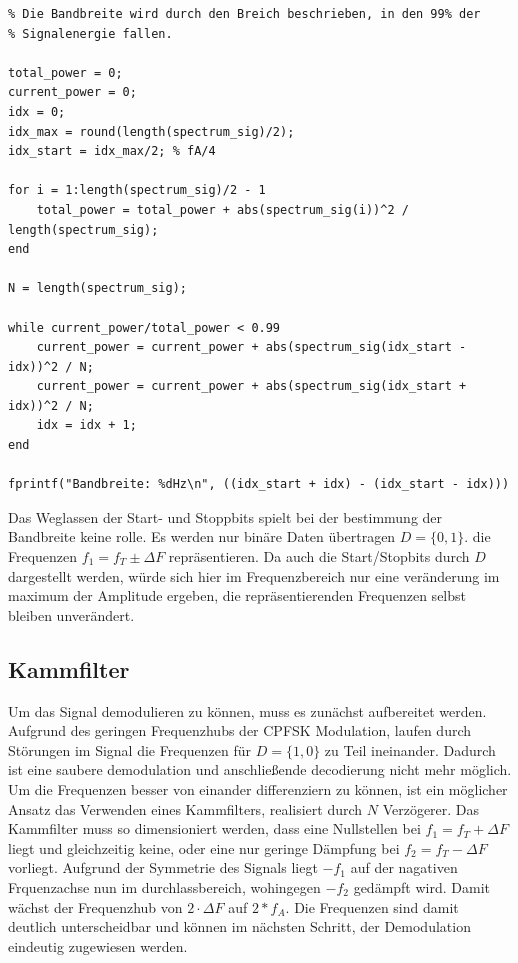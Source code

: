 \documentclass{article}
\begin{document}
\begin{verbatim}
% Die Bandbreite wird durch den Breich beschrieben, in den 99% der
% Signalenergie fallen.

total_power = 0;
current_power = 0;
idx = 0;
idx_max = round(length(spectrum_sig)/2);
idx_start = idx_max/2; % fA/4

for i = 1:length(spectrum_sig)/2 - 1
    total_power = total_power + abs(spectrum_sig(i))^2 / length(spectrum_sig);
end

N = length(spectrum_sig);

while current_power/total_power < 0.99
    current_power = current_power + abs(spectrum_sig(idx_start - idx))^2 / N;
    current_power = current_power + abs(spectrum_sig(idx_start + idx))^2 / N;
    idx = idx + 1;
end

fprintf("Bandbreite: %dHz\n", ((idx_start + idx) - (idx_start - idx)))
\end{verbatim}

Das Weglassen der Start- und Stoppbits spielt bei der bestimmung der Bandbreite keine rolle.
Es werden nur binäre Daten übertragen $D = \{0, 1\}$. die Frequenzen $ f_1 = f_T \pm \varDelta F $ repräsentieren. 
Da auch die Start/Stopbits durch $D$ dargestellt werden, würde sich hier im Frequenzbereich
nur eine veränderung im maximum der Amplitude ergeben, die repräsentierenden Frequenzen selbst bleiben unverändert.

\subsection{Kammfilter}
Um das Signal demodulieren zu können, muss es zunächst aufbereitet werden. 
Aufgrund des geringen Frequenzhubs der CPFSK Modulation, laufen durch Störungen im Signal die Frequenzen 
für $D = \{1, 0\}$ zu Teil ineinander. Dadurch ist eine saubere demodulation und anschließende decodierung
nicht mehr möglich. Um die Frequenzen besser von einander differenziern zu können, ist ein möglicher Ansatz 
das Verwenden eines Kammfilters, realisiert durch $N$ Verzögerer.
Das Kammfilter muss so dimensioniert werden, dass eine Nullstellen bei $f_1 = f_T + \varDelta F$ liegt und 
gleichzeitig keine, oder eine nur geringe Dämpfung bei $f_2 = f_T - \varDelta F$ vorliegt.
Aufgrund der Symmetrie des Signals liegt $-f_1$ auf der nagativen Frquenzachse nun im durchlassbereich, wohingegen 
$-f_2$ gedämpft wird. Damit wächst der Frequenzhub von $2 \cdot \varDelta F$ auf $2*f_A$. Die Frequenzen sind damit deutlich unterscheidbar
und können im nächsten Schritt, der Demodulation eindeutig zugewiesen werden.
\end{document}
